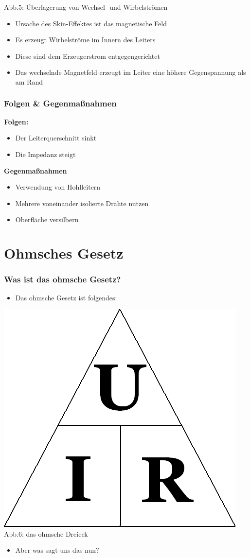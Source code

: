 \begin{frame}
\begin{center}
    \small{Abb.5: Überlagerung von Wechsel- und Wirbelströmen \cite{wp}}
    \begin{itemize}
      \item Ursache des Skin-Effektes ist das magnetische Feld
      \item Es erzeugt Wirbelströme im Innern des Leiters
      \item Diese sind dem Erzeugerstrom entgegengerichtet
      \item Das wechselnde Magnetfeld erzeugt im Leiter eine höhere Gegenspannung als am Rand
    \end{itemize}
  \end{center}
\end{frame}

\begin{frame}
  \frametitle{Folgen \& Gegenmaßnahmen}
  \textbf{Folgen:}
  \begin{itemize}
    \item Der Leiterquerschnitt sinkt
    \item Die Impedanz steigt
  \end{itemize}
  \textbf{Gegenmaßnahmen}
  \begin{itemize}
    \item Verwendung von Hohlleitern
    \item Mehrere voneinander isolierte Drähte nutzen
    \item Oberfläche versilbern
  \end{itemize}
\end{frame}

\section{Ohmsches Gesetz}

\begin{frame}
  \frametitle{Was ist das ohmsche Gesetz?}
  \begin{itemize}
    \item Das ohmsche Gesetz ist folgendes:
  \end{itemize}
  \begin{center}
    \includegraphics[width=.5\textwidth,height=.6\textheight,keepaspectratio]{e03/Ohm_law_triangle.png}\\
    \small{Abb.6: das ohmsche Dreieck \cite{wmen}}
  \end{center}
  \begin{itemize}
    \item	Aber was sagt uns das nun?
  \end{itemize}
\end{frame}

